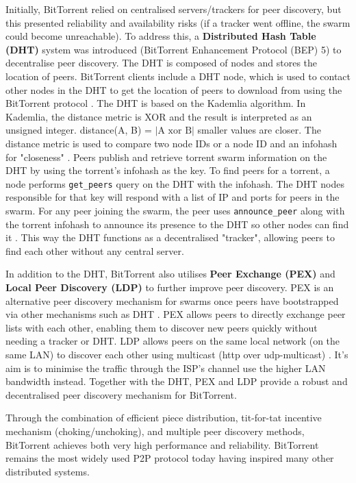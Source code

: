 \documentclass[12pt,a4paper]{report}
\begin{document}
Initially, BitTorrent relied on centralised servers/trackers for peer discovery, but this presented reliability and availability risks (if a tracker went offline, the swarm could become unreachable). To address this, a \textbf{Distributed Hash Table (DHT)} system was introduced (BitTorrent Enhancement Protocol (BEP) 5) to decentralise peer discovery. The DHT is composed of nodes and stores the location of peers. BitTorrent clients include a DHT node, which is used to contact other nodes in the DHT to get the location of peers to download from using the BitTorrent protocol \cite{bep_0005}. The DHT is based on the Kademlia algorithm. In Kademlia, the distance metric is XOR and the result is interpreted as an unsigned integer. distance(A, B) = $|\text{A xor B}|$ smaller values are closer. The distance metric is used to compare two node IDs or a node ID and an infohash for "closeness" \cite{bep_0005}. Peers publish and retrieve torrent swarm information on the DHT by using the torrent's infohash as the key. To find peers for a torrent, a node performs \texttt{get\_peers} query on the DHT with the infohash. The DHT nodes responsible for that key will respond with a list of IP and ports for peers in the swarm. For any peer joining the swarm, the peer uses \texttt{announce\_peer} along with the torrent infohash to announce its presence to the DHT so other nodes can find it \cite{bep_0005}. This way the DHT functions as a decentralised "tracker", allowing peers to find each other without any central server.

In addition to the DHT, BitTorrent also utilises \textbf{Peer Exchange (PEX)} and \textbf{Local Peer Discovery (LDP)} to further improve peer discovery. PEX is an alternative peer discovery mechanism for swarms once peers have bootstrapped via other mechanisms such as DHT \cite{bep_0011}. PEX allows peers to directly exchange peer lists with each other, enabling them to discover new peers quickly without needing a tracker or DHT. LDP allows peers on the same local network (on the same LAN) to discover each other using multicast (http over udp-multicast) \cite{bep_0014}. It's aim is to minimise the traffic through the ISP's channel use the higher LAN bandwidth instead. Together with the DHT, PEX and LDP provide a robust and decentralised peer discovery mechanism for BitTorrent.

Through the combination of efficient piece distribution, tit-for-tat incentive mechanism (choking/unchoking), and multiple peer discovery methods, BitTorrent achieves both very high performance and reliability. BitTorrent remains the most widely used P2P protocol today having inspired many other distributed systems.
\end{document}
